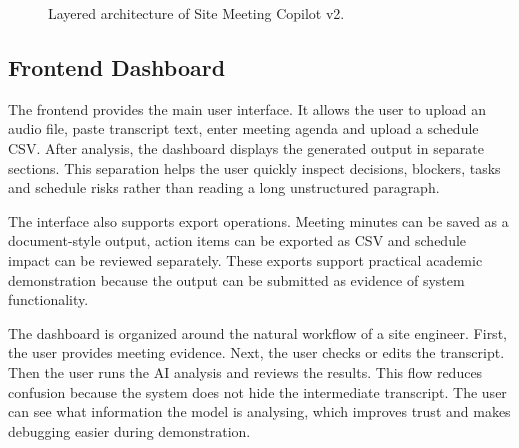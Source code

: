\documentclass[11pt,a4paper]{article}
\begin{document}
\begin{figure}[H]
\centering
{}
\caption{Layered architecture of Site Meeting Copilot v2.}
\end{figure}

\subsection{Frontend Dashboard}

The frontend provides the main user interface. It allows the user to upload an audio file, paste transcript text, enter meeting agenda and upload a schedule CSV. After analysis, the dashboard displays the generated output in separate sections. This separation helps the user quickly inspect decisions, blockers, tasks and schedule risks rather than reading a long unstructured paragraph.

The interface also supports export operations. Meeting minutes can be saved as a document-style output, action items can be exported as CSV and schedule impact can be reviewed separately. These exports support practical academic demonstration because the output can be submitted as evidence of system functionality.

The dashboard is organized around the natural workflow of a site engineer. First, the user provides meeting evidence. Next, the user checks or edits the transcript. Then the user runs the AI analysis and reviews the results. This flow reduces confusion because the system does not hide the intermediate transcript. The user can see what information the model is analysing, which improves trust and makes debugging easier during demonstration.
\end{document}

